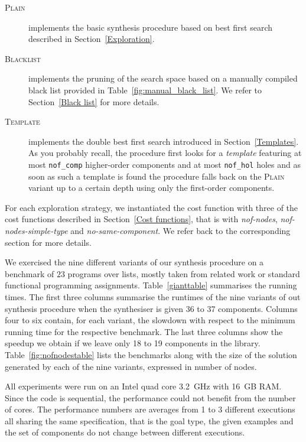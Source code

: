 \begin{description}
\item[\mdseries\textsc{Plain}] implements the basic synthesis procedure based on best first search described in Section~\ref{Exploration}.
\item[\mdseries\textsc{Blacklist}] implements the pruning of the search space based on a manually compiled black list provided in Table~\ref{fig:manual_black_list}. We refer to Section~\ref{Black list} for more details.
\item[\mdseries\textsc{Template}] implements the double best first search introduced in Section~\ref{Templates}. As you probably recall, the procedure first looks for a \emph{template} featuring at most \lstinline?nof_comp? higher-order components and at most \lstinline?nof_hol? holes and as soon as such a template is found the procedure falls back on the \textsc{Plain} variant up to a certain depth using only the first-order components.
\end{description}

For each exploration strategy, we instantiated the cost function with three of the cost functions described in Section~\ref{Cost functions}, that is with \textit{nof-nodes}, \textit{nof-nodes-simple-type} and \textit{no-same-component}. We refer back to the corresponding section for more details.

We exercised the nine different variants of our synthesis procedure on a benchmark of $23$ programs over lists, mostly taken from related work or standard functional programming assignments.
Table~\ref{gianttable} summarises the running times. The first three columns summarise the runtimes of the nine variants of out synthesis procedure when the synthesiser is given 36 to 37 components. Columns four to six contain, for each variant, the slowdown with respect to the minimum running time for the respective benchmark. The last three columns show the speedup we obtain if we leave only 18 to 19 components in the library.
Table~\ref{fig:nofnodestable} lists the benchmarks along with the size of the solution generated by each of the nine variants, expressed in number of nodes.

All experiments were run on an Intel quad core 3.2~GHz with 16~GB RAM. Since the code is sequential, the performance could not benefit from the number of cores. The performance numbers are averages from 1 to 3 different executions all sharing the same specification, that is the goal type, the given examples and the set of components do not change between different executions.

